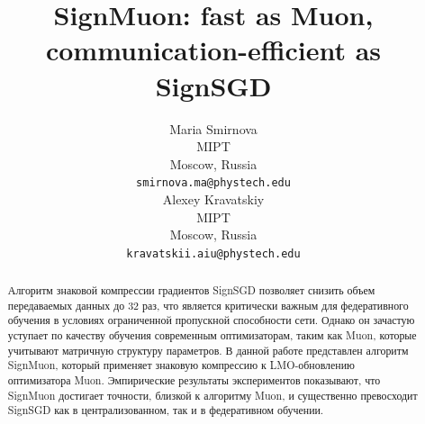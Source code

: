 \documentclass{article}
\title{SignMuon: fast as Muon, communication-efficient as SignSGD}
\author{
  Maria Smirnova\\
  MIPT\\
  Moscow, Russia\\
  \texttt{smirnova.ma@phystech.edu}\\
  \And
  Alexey Kravatskiy \\
  MIPT\\
  Moscow, Russia\\
  \texttt{kravatskii.aiu@phystech.edu}\\
}
\begin{document}
\maketitle

\begin{abstract}

Алгоритм знаковой компрессии градиентов SignSGD позволяет снизить объем передаваемых данных до 32 раз, что является критически важным для федеративного обучения в условиях ограниченной пропускной способности сети. Однако он зачастую уступает по качеству обучения современным оптимизаторам, таким как Muon, которые учитывают матричную структуру параметров. В данной работе представлен алгоритм SignMuon, который применяет знаковую компрессию к LMO-обновлению оптимизатора Muon. Эмпирические результаты экспериментов показывают, что SignMuon достигает точности, близкой к алгоритму Muon, и существенно превосходит SignSGD как в централизованном, так и в федеративном обучении.
    
\end{abstract}
\end{document}
